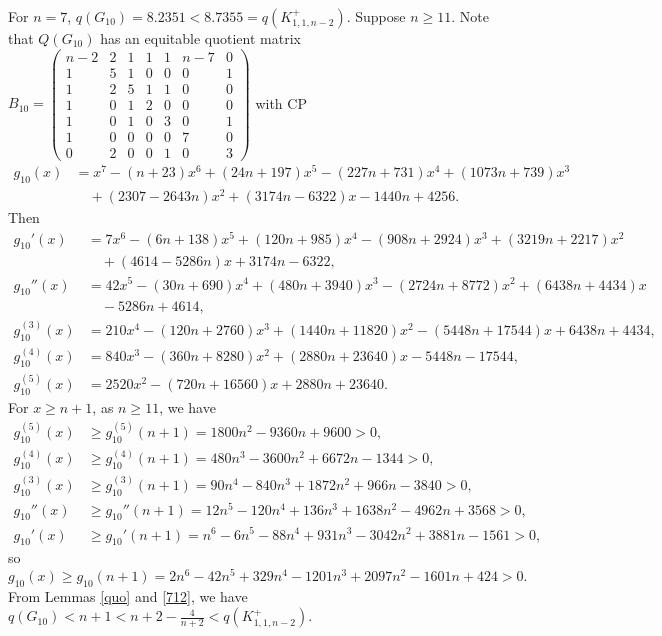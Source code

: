 \documentclass[12pt]{article}
\begin{document}
\begin{appendices}
For $n=7$,  $q(G_{10})=8.2351<8.7355=q(K_{1,1,n-2}^+)$.
Suppose $n\ge 11$. Note that $Q(G_{10})$ has an equitable quotient matrix
$
B_{10}=
\left(\begin{smallmatrix}
n-2 & 2 & 1& 1& 1 & n-7 & 0\\
1 &5 &1 & 0&0 &0 &1\\
1 &2 &5 & 1&1 &0 &0\\
1 &0 &1 & 2 &0 &0 &0\\
1 &0 &1 &0 &3 &0 &1\\
1 &0 &0 & 0&0 &7 &0\\
0 &2 &0 &0 &1 &0 &3
\end{smallmatrix}\right)$
with CP
\begin{align*}
g_{10}(x)&=x^7 -( n + 23)x^6 + (24n + 197)x^5 -( 227n + 731)x^4 + (1073n + 739)x^3 \\
&\quad + (2307 - 2643n)x^2 + (3174n - 6322)x - 1440n + 4256.
\end{align*}
Then
\begin{align*}
g_{10}'(x)&=7x^6 -( 6n + 138)x^5 + (120n + 985)x^4 -( 908n + 2924)x^3+ (3219n + 2217)x^2 \\
&\quad + (4614 - 5286n)x + 3174n - 6322,\\
g_{10}''(x)&=42x^5 - ( 30n + 690)x^4 + (480n + 3940)x^3 - ( 2724n +8772)x^2+ (6438n + 4434)x\\
& \quad - 5286n + 4614,\\
g_{10}^{(3)}(x)&=210x^4 -( 120n + 2760)x^3 + (1440n + 11820)x^2 - ( 5448n + 17544)x + 6438n + 4434,\\
g_{10}^{(4)}(x)&=840x^3 -( 360n + 8280)x^2 + (2880n + 23640)x - 5448n - 17544,\\
g_{10}^{(5)}(x)&=2520x^2 - ( 720n +16560)x + 2880n + 23640.
\end{align*}
For  $x\ge n+1$, as $n\ge 11$, we have
\begin{align*}
g_{10}^{(5)}(x)&\ge g_{10}^{(5)}(n+1)=1800n^2 - 9360n + 9600>0,\\
g_{10}^{(4)}(x)&\ge g_{10}^{(4)}(n+1)=480n^3 - 3600n^2 + 6672n - 1344>0,\\
g_{10}^{(3)}(x)&\ge g_{10}^{(3)}(n+1)=90n^4 - 840n^3 + 1872n^2 + 966n - 3840>0,\\
g_{10}''(x)&\ge g_{10}''(n+1)=12n^5 - 120n^4 + 136n^3 + 1638n^2 - 4962n + 3568>0,\\
g_{10}'(x)&\ge g_{10}'(n+1)=n^6 - 6n^5 - 88n^4 + 931n^3 - 3042n^2 + 3881n - 1561>0,
\end{align*}
so
\[
g_{10}(x)\ge g_{10}(n+1)=2n^6 - 42n^5 + 329n^4 - 1201n^3 + 2097n^2 - 1601n + 424>0.
\]
From Lemmas \ref{quo} and \ref{712}, we have $q(G_{10})<n+1<n+2-\frac{4}{n+2}<q(K_{1,1,n-2}^+)$.\\


\end{appendices}
\end{document}
